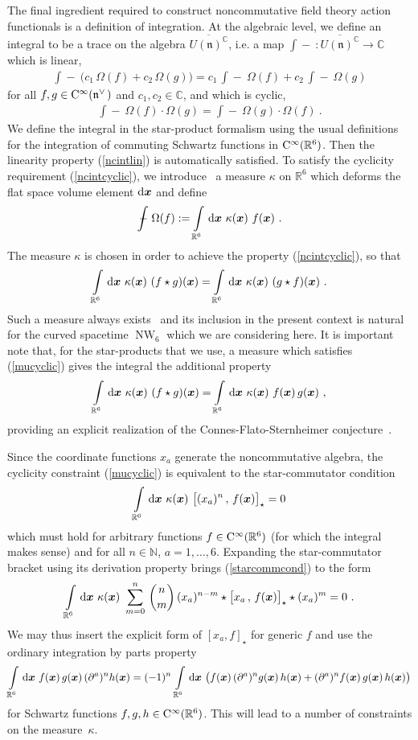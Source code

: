 \documentclass[11pt,a4paper]{article}
\DeclareMathOperator{\NW}{NW}
\newcommand{\1}{\mathbb{1}}
\newcommand{\N}{\nat}
\newcommand{\mbf}[1]{{\boldsymbol {#1} }}
\def\dd{{\rm d}}
\def\CC{{\rm C}}
\def\mfn{{\mathfrak n}}
\newcommand{\ncint}{\int\!\!\!\!\!\! - ~}
\newcommand{\R}{\real}
\newcommand{\complex}{{\mathbb C}} %
\newcommand{\nat}{{\mathbb N}} %
\newcommand{\real}{{\mathbb R}} %
\newcommand{\beq}{\begin{eqnarray}}
\newcommand{\eeq}{\end{eqnarray}}
\begin{document}
The final ingredient required to construct noncommutative field theory
action functionals is a definition of integration. At the algebraic
level, we define an integral to be a
trace on the algebra $\overline{U(\mfn)^\complex}$, i.e. a map
$\ncint:\overline{U(\mfn)^\complex}\to\complex$ which is linear,
\beq
\ncint\bigl(c_1\,\Omega(f)+c_2\,\Omega(g)\bigr)=
c_1\,\ncint\Omega(f)+c_2\,\ncint\Omega(g)
\label{ncintlin}\eeq
for all $f,g\in\CC^\infty(\mfn^{\vee\,})$ and $c_1,c_2\in\complex$, and which
is cyclic,
\beq
\ncint\Omega(f)\cdot\Omega(g)=\ncint\Omega(g)\cdot\Omega(f) \ .
\label{ncintcyclic}\eeq
We define the integral in the star-product formalism using the usual
definitions for the integration of commuting Schwartz functions in
$\CC^\infty(\R^6)$. Then the linearity property (\ref{ncintlin}) is
automatically satisfied. To satisfy the cyclicity requirement
(\ref{ncintcyclic}), we
introduce~\cite{CalWohl1,BehrSyk1,AA-CAA1,DJMTWW1,FelShoi1} a measure
$\kappa$ on $\R^6$ which deforms the flat space volume element
$\dd\mbf x$ and define
\beq
\ncint\Omega(f):=\int\limits_{\R^6}\,\dd\mbf x~\kappa(\mbf x)~f(\mbf x) \ .
\label{ncintdef}\eeq
The measure $\kappa$ is chosen in order to achieve the property
(\ref{ncintcyclic}), so that
\beq
\int\limits_{\R^6}\,\dd\mbf x~\kappa(\mbf x)~(f\star g)(\mbf x)=
\int\limits_{\R^6}\,\dd\mbf x~\kappa(\mbf x)~(g\star f)(\mbf x) \ .
\label{mucyclic}\eeq
Such a measure always exists~\cite{CalWohl1,DJMTWW1,FelShoi1} and its
inclusion in the present context is natural for the curved spacetime
$\NW_6$ which we are considering here. It is important note that, for
the star-products that we use, a measure which satisfies
(\ref{mucyclic}) gives the integral the additional property
\beq
\int\limits_{\R^6}\,\dd\mbf x~\kappa(\mbf x)~(f\star g)(\mbf x)=
\int\limits_{\R^6}\,\dd\mbf x~\kappa(\mbf x)~f(\mbf x)\,g(\mbf x) \ ,
\label{ncintaddprop}\eeq
providing an explicit realization of the Connes-Flato-Sternheimer
conjecture~\cite{FelShoi1}.

Since the coordinate functions $x_a$ generate the
noncommutative algebra, the cyclicity constraint (\ref{mucyclic}) is
equivalent to the star-commutator condition
\beq
\int\limits_{\R^6}\,\dd\mbf x~\kappa(\mbf x)~\bigl[(x_a)^n\,,\,f(\mbf x)
\bigr]_\star=0
\label{starcommcond}\eeq
which must hold for arbitrary functions $f\in\CC^\infty(\R^6)$ (for
which the integral makes sense) and for
all $n\in\N$, $a=1,\dots,6$. Expanding the star-commutator bracket
using its derivation property brings (\ref{starcommcond}) to the form
\beq
\int\limits_{\R^6}\,\dd\mbf x~\kappa(\mbf x)~\sum_{m=0}^n\,{n\choose
  m}\,(x_a)^{n-m}\star\bigl[x_a\,,\,f(\mbf x)\bigr]_\star\star
(x_a)^m=0 \ .
\label{commcondexp}\eeq
We may thus insert the explicit form of $[x_a,f]_\star$ for generic
$f$ and use the ordinary integration by parts property
\beq
\int\limits_{\R^6}\,\dd\mbf x~f(\mbf x)\,g(\mbf x)\,(\partial^a)^nh(\mbf x)=
(-1)^n\,\int\limits_{\R^6}\,\dd\mbf x~\bigl(f(\mbf x)\,(\partial^a)^n
g(\mbf x)\,
h(\mbf x)+(\partial^a)^nf(\mbf x)\,g(\mbf x)\,h(\mbf x)\bigr)
\label{intpartsfgh}\eeq
for Schwartz functions $f,g,h\in\CC^\infty(\R^6)$. This will lead to a
number of constraints on the measure~$\kappa$.
\end{document}
